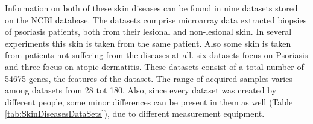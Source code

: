 \documentclass[10pt,a4paper]{article}
\begin{document}
	Information on both of these skin diseases can be found in nine datasets stored on the NCBI database\cite{edgar2002gene}. The datasets comprise microarray data extracted biopsies of psoriasis patients, both from their lesional and non-lesional skin. In several experiments this skin is taken from the same patient. Also some skin is taken from patients not suffering from the diseases at all. six datasets focus on Psoriasis and three focus on atopic dermatitis. These datasets consist of a total number of 54675 genes, the features of the dataset. The range of acquired samples varies among datasets from 28 tot 180. Also, since every dataset was created by different people, some minor differences can be present in them as well (Table \ref{tab:SkinDiseasesDataSets}), due to different measurement equipment.
	
\end{document}
